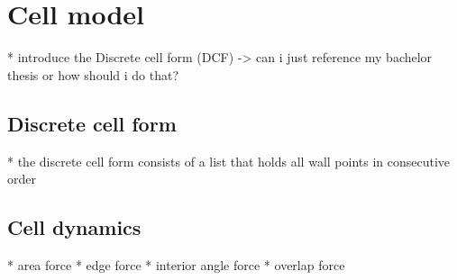 \section{Cell model} 
* introduce the Discrete cell form (DCF) 
    -> can i just reference my bachelor thesis or how should i do that? 

\subsection{Discrete cell form}
* the discrete cell form consists of a list that holds all wall points in consecutive order 

\subsection{Cell dynamics} 
* area force 
* edge force 
* interior angle force 
* overlap force 